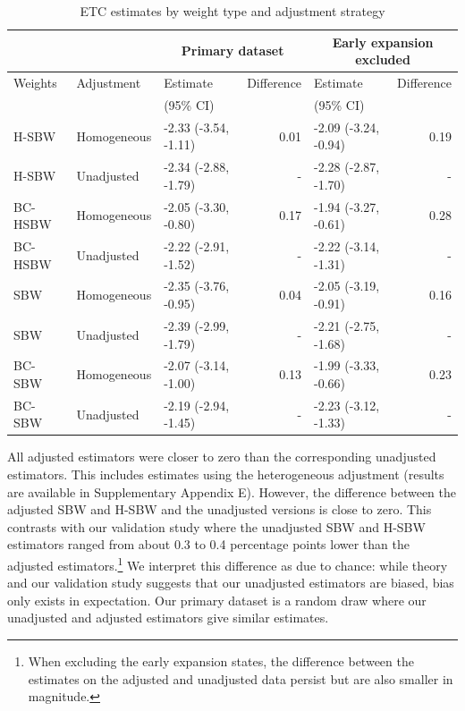 \documentclass[aoas]{imsart}
\theoremstyle{plain}
\theoremstyle{remark}
\begin{document}
\begin{table}[ht]\caption{ETC estimates by weight type and adjustment strategy}\label{tab:mainresults}
\begin{tabular}{lllrlr} 
\hline
 &  & \multicolumn{2}{c}{Primary dataset} & \multicolumn{2}{c}{Early expansion 
 excluded} \\
  \hline
Weights & Adjustment & Estimate  & Difference & Estimate & Difference\\ 
 &  & (95\% CI) &  & (95\% CI) & \\
  \hline
H-SBW & Homogeneous & -2.33 (-3.54, -1.11) & 0.01 & -2.09 (-3.24, -0.94) & 0.19 \\ 
  H-SBW & Unadjusted & -2.34 (-2.88, -1.79) & - & -2.28 (-2.87, -1.70) & - \\ 
  BC-HSBW & Homogeneous & -2.05 (-3.30, -0.80) & 0.17 & -1.94 (-3.27, -0.61) & 0.28 \\ 
  BC-HSBW & Unadjusted & -2.22 (-2.91, -1.52) & - & -2.22 (-3.14, -1.31) & - \\ 
  SBW & Homogeneous & -2.35 (-3.76, -0.95) & 0.04 & -2.05 (-3.19, -0.91) & 0.16 \\ 
  SBW & Unadjusted & -2.39 (-2.99, -1.79) & - & -2.21 (-2.75, -1.68) & - \\ 
  BC-SBW & Homogeneous & -2.07 (-3.14, -1.00) & 0.13 & -1.99 (-3.33, -0.66) & 0.23 \\ 
  BC-SBW & Unadjusted & -2.19 (-2.94, -1.45) & - & -2.23 (-3.12, -1.33) & - \\    
  \hline
\end{tabular}
\end{table}

All adjusted estimators were closer to zero than the corresponding unadjusted estimators. This includes estimates using the heterogeneous adjustment (results are available in Supplementary Appendix E). However, the difference between the adjusted SBW and H-SBW and the unadjusted versions is close to zero. This contrasts with our validation study where the unadjusted SBW and H-SBW estimators ranged from about 0.3 to 0.4 percentage points lower than the adjusted estimators.\footnote{When excluding the early expansion states, the difference between the estimates on the adjusted and unadjusted data persist but are also smaller in magnitude.} We interpret this difference as due to chance: while theory and our validation study suggests that our unadjusted estimators are biased, bias only exists in expectation. Our primary dataset is a random draw where our unadjusted and adjusted estimators give similar estimates.
\end{document}
